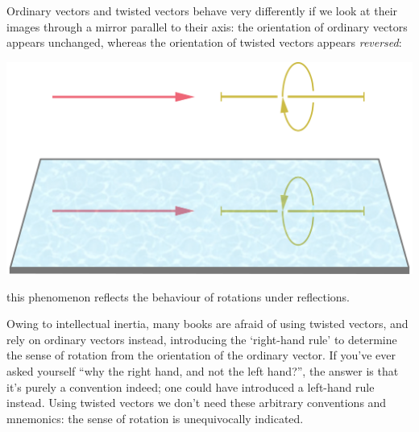 \documentclass[a4paper,12pt,%
onecolumn,oneside,%
british%
]{memoir}
\renewcommand*{\|}[1][]{\nonscript\:#1\vert\nonscript\:\mathopen{}}
\begin{document}
Ordinary vectors and twisted vectors behave very differently if we look at their images through a mirror parallel to their axis: the orientation of ordinary vectors appears unchanged, whereas the orientation of twisted vectors appears \emph{reversed}:
\begin{center}
  \includegraphics[width=0.67\linewidth]{images/mirror.pdf}
\end{center}
this phenomenon reflects the behaviour of rotations under reflections.

\medskip

Owing to intellectual inertia, many books are afraid of using twisted vectors, and rely on ordinary vectors instead, introducing the \enquote*{right-hand rule} to determine the sense of rotation from the orientation of the ordinary vector. If you've ever asked yourself \enquote{why the right hand, and not the left hand?}, the answer is that it's purely a convention indeed; one could have introduced a left-hand rule instead. Using twisted vectors we don't need these arbitrary conventions and mnemonics: the sense of rotation is unequivocally indicated.
%
%
\end{document}
